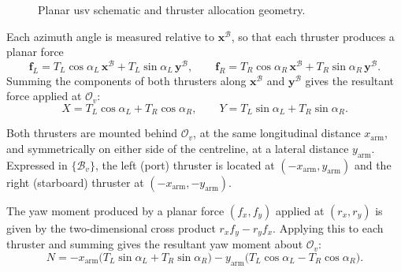 \begin{figure}[H]
    \caption{Planar \gls{usv} schematic and thruster allocation geometry.}
    \label{fig:usv_planar_model}
\end{figure}

Each azimuth angle is measured relative to $\mathbf{x}^{\mathcal{B}}$, so that each thruster produces a planar force
\begin{equation}
    \mathbf{f}_L = T_L\cos\alpha_L\,\mathbf{x}^{\mathcal{B}} + T_L\sin\alpha_L\,\mathbf{y}^{\mathcal{B}}, \qquad
    \mathbf{f}_R = T_R\cos\alpha_R\,\mathbf{x}^{\mathcal{B}} + T_R\sin\alpha_R\,\mathbf{y}^{\mathcal{B}}.
    \label{eq:usv_thruster_forces}
\end{equation}
Summing the components of both thrusters along $\mathbf{x}^{\mathcal{B}}$ and $\mathbf{y}^{\mathcal{B}}$ gives the resultant force applied at $\mathcal{O}_v$:
\begin{equation}
    X = T_L\cos\alpha_L + T_R\cos\alpha_R, \qquad
    Y = T_L\sin\alpha_L + T_R\sin\alpha_R.
    \label{eq:usv_thruster_force_sum}
\end{equation}

Both thrusters are mounted behind $\mathcal{O}_v$, at the same longitudinal distance $x_{\mathrm{arm}}$, and symmetrically on either side of the centreline, at a lateral distance $y_{\mathrm{arm}}$. Expressed in $\{\mathcal{B}_v\}$, the left (port) thruster is located at $(-x_{\mathrm{arm}}, y_{\mathrm{arm}})$ and the right (starboard) thruster at $(-x_{\mathrm{arm}}, -y_{\mathrm{arm}})$. 

The yaw moment produced by a planar force $(f_x, f_y)$ applied at $(r_x, r_y)$ is given by the two-dimensional cross product $r_x f_y - r_y f_x$. Applying this to each thruster and summing gives the resultant yaw moment about $\mathcal{O}_v$:
\begin{equation}
    N = -x_{\mathrm{arm}}\big(T_L\sin\alpha_L + T_R\sin\alpha_R\big) - y_{\mathrm{arm}}\big(T_L\cos\alpha_L - T_R\cos\alpha_R\big).
    \label{eq:usv_thruster_moment}
\end{equation}

